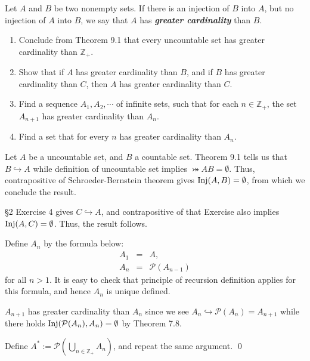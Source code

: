 \documentclass[a4paper,12pt]{article}
\begin{document}
\begin{exe}
	Let \( A \) and \( B \) be two nonempty sets.
	If there is an injection of \( B \) into \( A \),
	but no injection of \( A \) into \( B \),
	we say that \( A \) has \textbf{\textit{greater cardinality}} than \( B \).
	\begin{enumerate}
		\item
		      Conclude from Theorem 9.1 that every uncountable set has greater cardinality than \( \mathbb{Z}_{+} \).
		      
		\item
		      Show that if \( A \) has greater cardinality than \( B \),
		      and if \( B \) has greater cardinality than \( C \),
		      then \( A \) has greater cardinality than \( C \).
		      
		\item
		      Find a sequence \( A_1,A_2,\cdots \) of infinite sets, such that for each
		      \( n \in \mathbb{Z}_{+} \),
		      the set \( A_{n+1} \) has greater cardinality than \( A_n \).
		      
		\item
		      Find a set that for every \( n \) has greater cardinality than \( A_n \).
	\end{enumerate}
\end{exe}
\begin{sol}\leavevmode \par
	Let \( A \) be a uncountable set, and \( B \) a countable set.
	Theorem 9.1 tells us that \( B \hookrightarrow A \)
	while definition of uncountable set implies
	\( \bij{A}{B} = \emptyset \).
	Thus, contrapositive of Schroeder-Bernstein theorem gives
	\( \mathrm{Inj}(A,B) = \emptyset \),
	from which we conclude the result.
	
	\S2 Exercise 4 gives \( C \hookrightarrow A \),
	and contrapositive of that Exercise also implies
	\( \mathrm{Inj}(A,C) = \emptyset \).
	Thus, the result follows.
	
	Define \( A_n \) by the formula below:
	\begin{eqnarray*}
		A_1&=&A,\\
		A_n&=&\mathcal{P}(A_{n-1})
	\end{eqnarray*}
	for all \( n >1 \).
	It is easy to check that principle of recursion definition applies for this formula,
	and hence \( A_n \) is unique defined.
	
	\( A_{n+1} \) has greater cardinality than \( A_n \)
	since we see
	\( A_n \hookrightarrow \mathcal{P}(A_n) = A_{n+1} \)
	while there holds 
	\( \mathrm{Inj}(\mathcal{P}(A_n),A_n) = \emptyset \)
	by Theorem 7.8.
	
	Define
	\( A^{\ast}:=\mathcal{P}(\bigcup_{n\in \mathbb{Z}_{+}}A_n)\),
	and repeat the same argument.
	\qed\end{sol}
\end{document}
